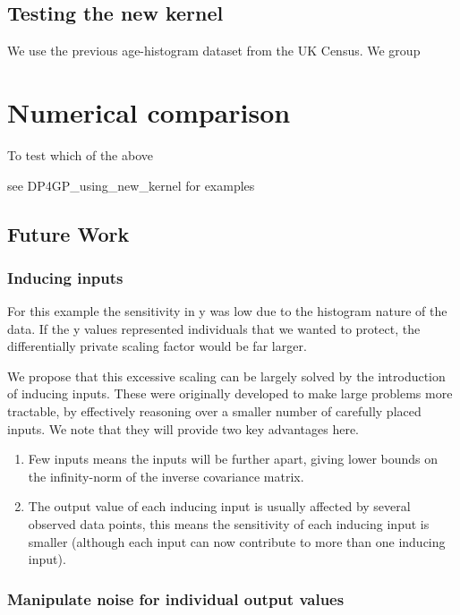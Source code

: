 \documentclass[a4paper]{article}
\begin{document}
\begin{multicols}{2}
\subsection{Testing the new kernel}

We use the previous age-histogram dataset from the UK Census. We group 

\section{Numerical comparison}

To test which of the above 

see DP4GP\_using\_new\_kernel for examples

\subsection{Future Work}
\subsubsection{Inducing inputs}

For this example the sensitivity in y was low due to the histogram nature of the data. If the y values represented individuals that we wanted to protect, the differentially private scaling factor would be far larger.
 
We propose that this excessive scaling can be largely solved by the introduction of inducing inputs. These were originally developed to make large problems more tractable, by effectively reasoning over a smaller number of carefully placed inputs. We note that they will provide two key advantages here. 

\begin{enumerate}
\item Few inputs means the inputs will be further apart, giving lower bounds on the infinity-norm of the inverse covariance matrix.
\item The output value of each inducing input is usually affected by several observed data points, this means the sensitivity of each inducing input is smaller (although each input can now contribute to more than one inducing input).
\end{enumerate}

\subsubsection{Manipulate noise for individual output values}


\end{multicols}
\end{document}
